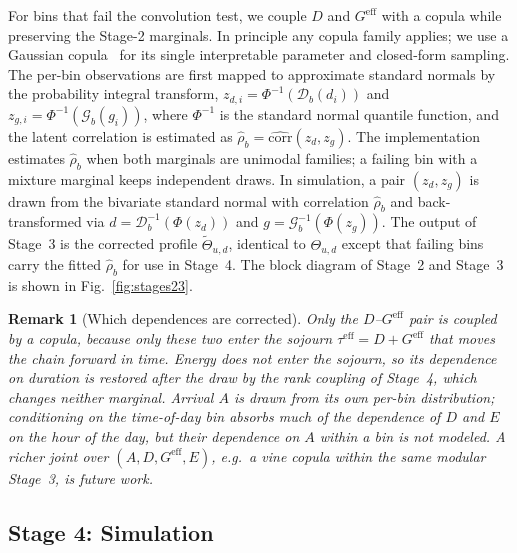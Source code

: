 \documentclass[journal]{IEEEtran}
\newtheorem{remark}{Remark}
\begin{document}
For bins that fail the convolution test, we couple $D$ and $G^{\mathrm{eff}}$ with a copula while preserving the Stage-2 marginals. In principle any copula family applies; we use a Gaussian copula~\cite{nelsen2006introduction} for its single interpretable parameter and closed-form sampling. The per-bin observations are first mapped to approximate standard normals by the probability integral transform, $z_{d,i} = \Phi^{-1}(\mathcal{D}_b(d_i))$ and $z_{g,i} = \Phi^{-1}(\mathcal{G}_b(g_i))$, where $\Phi^{-1}$ is the standard normal quantile function, and the latent correlation is estimated as $\hat{\rho}_b = \widehat{\mathrm{corr}}(z_d, z_g)$. The implementation estimates $\hat{\rho}_b$ when both marginals are unimodal families; a failing bin with a mixture marginal keeps independent draws. In simulation, a pair $(z_d, z_g)$ is drawn from the bivariate standard normal with correlation $\hat{\rho}_b$ and back-transformed via $d = \mathcal{D}_b^{-1}(\Phi(z_d))$ and $g = \mathcal{G}_b^{-1}(\Phi(z_g))$.
The output of Stage~3 is the corrected profile $\tilde{\Theta}_{u,d}$, identical to $\Theta_{u,d}$ except that failing bins carry the fitted $\hat{\rho}_b$ for use in Stage~4. The block diagram of Stage~2 and Stage~3 is shown in Fig.~\ref{fig:stages23}.

\begin{remark}[Which dependences are corrected]
\label{rem:which-dependence}
Only the $D$--$G^{\mathrm{eff}}$ pair is coupled by a copula, because only these two enter the sojourn $\tau^{\mathrm{eff}} = D + G^{\mathrm{eff}}$ that moves the chain forward in time. Energy does not enter the sojourn, so its dependence on duration is restored after the draw by the rank coupling of Stage~4, which changes neither marginal. Arrival $A$ is drawn from its own per-bin distribution; conditioning on the time-of-day bin absorbs much of the dependence of $D$ and $E$ on the hour of the day, but their dependence on $A$ within a bin is not modeled. A richer joint over $(A, D, G^{\mathrm{eff}}, E)$, e.g.\ a vine copula within the same modular Stage~3, is future work.
\end{remark}


\subsection{Stage 4: Simulation}
\label{subsec:stage4}
\end{document}
